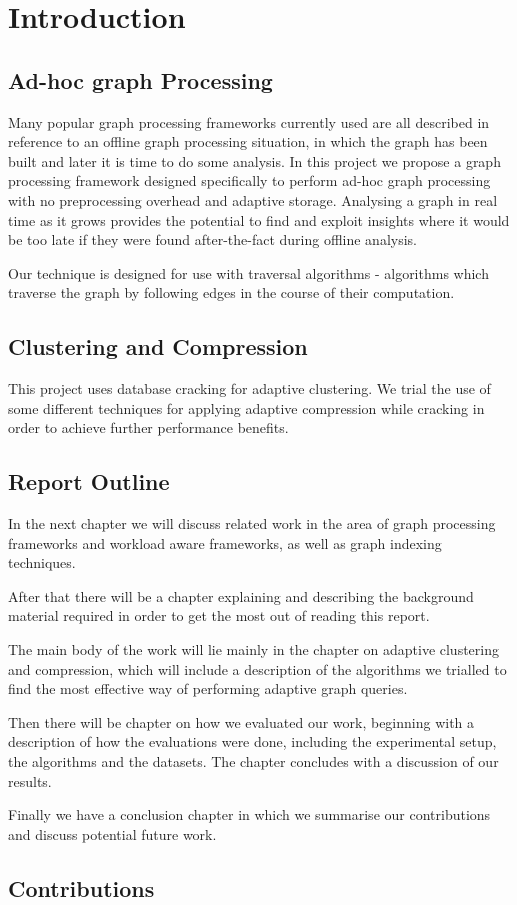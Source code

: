 \chapter{Introduction}

\section{Ad-hoc graph Processing}

Many popular graph processing frameworks currently used are all described in reference to an
offline graph processing situation, in which the graph has been built and later it is time to do some
analysis. In this project we propose a graph processing framework designed specifically to perform
ad-hoc graph processing with no preprocessing overhead and adaptive storage. Analysing a graph in real
time as it grows provides the potential to find and exploit insights where it would be too late if
they were found after-the-fact during offline analysis.

Our technique is designed for use with traversal algorithms - algorithms which traverse the graph
by following edges in the course of their computation.

\section{Clustering and Compression}

This project uses database cracking for adaptive clustering. We trial the use of some different
techniques for applying adaptive compression while cracking in order to achieve further performance benefits.

\section{Report Outline}

In the next chapter we will discuss related work in the area of graph processing frameworks and
workload aware frameworks, as well as graph indexing techniques.

After that there will be a chapter explaining and describing the background material required in order
to get the most out of reading this report.

The main body of the work will lie mainly in the chapter on adaptive clustering and compression, which
will include a description of the algorithms we trialled to find the most effective way of performing
adaptive graph queries.

Then there will be chapter on how we evaluated our work, beginning with a description of how the
evaluations were done, including the experimental setup, the algorithms and the datasets. The chapter
concludes with a discussion of our results.

Finally we have a conclusion chapter in which we summarise our contributions and discuss potential future work.

\section{Contributions}

